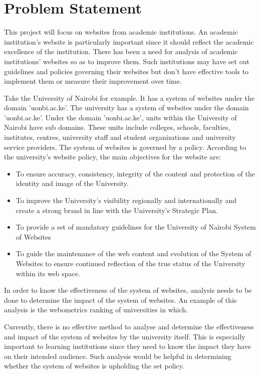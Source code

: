 \section{Problem Statement}
This project will focus on websites from academic institutions. An academic institution's website is particularly important since it should reflect the academic excellence of the institution. There has been a need for analysis of academic institutions' websites so as to improve them. Such institutions may have set out guidelines and policies governing their websites but don't have effective tools to implement them or measure their improvement over time.

\noindent
Take the University of Nairobi for example. It has a system of websites under the domain 'uonbi.ac.ke'. The university has a system of websites under the domain 'uonbi.ac.ke'. Under the domain 'uonbi.ac.ke', units within the  University of Nairobi have sub domains. These units include colleges, schools, faculties, institutes, centres, university staff and student organizations and university service providers. The system of websites is governed by a policy. According to the university's website policy, the main objectives for the website are:
\begin{itemize}
\item To ensure accuracy, consistency, integrity of the content and protection of the identity and image of the University.
\item To improve the University's visibility regionally and internationally and create a strong brand in line with the University's Strategic Plan.
\item To provide a set of mandatory guidelines for the University of Nairobi System of Websites
\item To guide the maintenance of the web content and evolution of the System of Websites to ensure continued reflection of the true status of the University within its web space.
\end{itemize}

\noindent
In order to know the effectiveness of the system of websites, analysis needs to be done to determine the impact of the system of websites. An example of this analysis is the webometrics ranking of universities in which.

\noindent
Currently, there is no effective method to analyse and determine the effectiveness and impact of the system of websites by the university itself. This is especially important to learning institutions since they need to know the impact they have on their intended audience.  Such analysis would be helpful in determining whether the system of websites is upholding the set policy.


